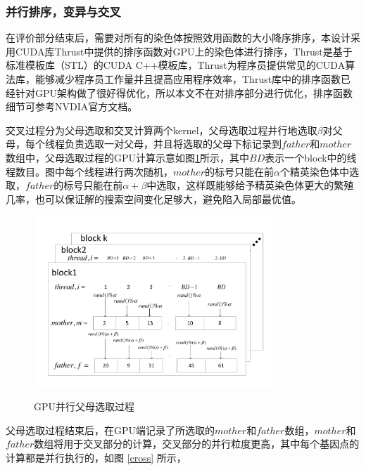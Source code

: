 \subsubsection{并行排序，变异与交叉}
在评价部分结束后，需要对所有的染色体按照效用函数的大小降序排序，本设计采用CUDA库Thrust中提供的排序函数对GPU上的染色体进行排序，Thrust是基于标准模板库（STL）的CUDA C++模板库，Thrust为程序员提供常见的CUDA算法库，能够减少程序员工作量并且提高应用程序效率，Thrust库中的排序函数已经针对GPU架构做了很好得优化，所以本文不在对排序部分进行优化，排序函数细节可参考NVDIA官方文档。

交叉过程分为父母选取和交叉计算两个kernel，父母选取过程并行地选取$\beta$对父母，每个线程负责选取一对父母，并且将选取的父母下标记录到$father$和$mother$数组中，父母选取过程的GPU计算示意如图\ref{pp}所示，其中$BD$表示一个block中的线程数目。图中每个线程进行两次随机，$mother$的标号只能在前$\alpha$个精英染色体中选取，$father$的标号只能在前$\alpha+\beta$中选取，这样既能够给予精英染色体更大的繁殖几率，也可以保证解的搜索空间变化足够大，避免陷入局部最优值。
\begin{figure}
\vspace{-1cm}
\setlength{\abovecaptionskip}{-0.5cm}
\begin{center}
{\includegraphics[width=0.8\textwidth]{figures/GPUchoose.pdf}}
\end{center}
\caption{{\footnotesize{GPU并行父母选取过程}}}
\label{pp}
\end{figure}


父母选取过程结束后，在GPU端记录了所选取的$mother$和$father$数组，$mother$和$father$数组将用于交叉部分的计算，交叉部分的并行粒度更高，其中每个基因点的计算都是并行执行的，如图 \ref{cross} 所示，

